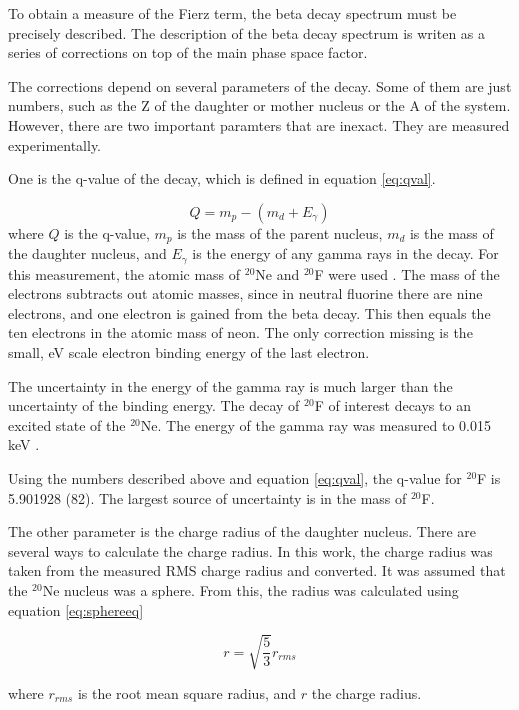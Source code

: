 
To obtain a measure of the Fierz term, the beta decay spectrum must be precisely described.
The description of the beta decay spectrum is writen as a series of corrections on top of the main phase space factor.  

The corrections depend on several parameters of the decay. 
Some of them are just numbers, such as the Z of the daughter or mother nucleus or the A of the system.
However, there are two important paramters that are inexact.
They are measured experimentally.

One is the q-value of the decay, which is defined in equation \ref{eq:qval}.

\begin{equation}
	Q = m_{p} - (m_{d} + E_{\gamma})
	\label{eq:qval}
\end{equation} 
where $Q$ is the q-value, $m_{p}$ is the mass of the parent nucleus, $m_{d}$ is the mass of the daughter nucleus, and $E_{\gamma}$ is the energy of any gamma rays in the decay.
For this measurement, the atomic mass of $^{20}$Ne and $^{20}$F were used \cite{Pfe12}.
The mass of the electrons subtracts out atomic masses, since in neutral fluorine there are nine electrons, and one electron is gained from the beta decay.
This then equals the ten electrons in the atomic mass of neon.
The only correction missing is the small, eV scale electron binding energy of the last electron.

The uncertainty in the energy of the gamma ray is much larger than the uncertainty of the binding energy.
The decay of $^{20}$F of interest decays to an excited state of the $^{20}$Ne.
The energy of the gamma ray was measured to 0.015 keV \cite{Til98}.

Using the numbers described above and equation \ref{eq:qval}, the q-value for $^{20}$F is 5.901928 (82).
The largest source of uncertainty is in the mass of $^{20}$F.


The other parameter is the charge radius of the daughter nucleus.
There are several ways to calculate the charge radius.
In this work, the charge radius was taken from the measured RMS charge radius and converted.
It was assumed that the $^{20}$Ne nucleus was a sphere. 
From this, the radius was calculated using equation \ref{eq:sphereeq}

\begin{equation}
	r = \sqrt{\frac{5}{3}}r_{rms}	
	\label{eq:sphereeq}
\end{equation}

where $r_{rms}$ is the root mean square radius, and $r$ the charge radius.

